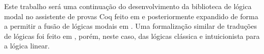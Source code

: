 Este trabalho será uma continuação do desenvolvimento da biblioteca de lógica modal no assistente de provas Coq feito em \cite{Silveira} e posteriormente expandido de forma a permitir a fusão de lógicas modais em \cite{Nunes}. Uma formalização similar de traduções de lógicas foi feito em \cite{Sehnem}, porém, neste caso, das lógicas clássica e intuicionista para a lógica linear.